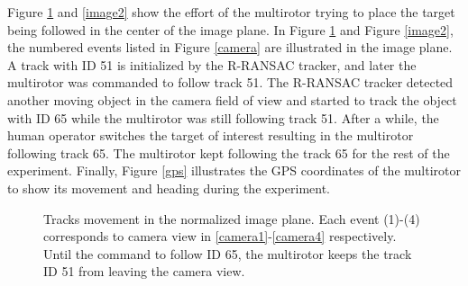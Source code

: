 Figure \ref{image1} and \ref{image2} show the effort of the multirotor trying to place the target being followed in the center of the image plane. In Figure \ref{image1} and Figure \ref{image2}, the numbered events listed in Figure \ref{camera} are illustrated in the image plane. A track with ID 51 is initialized by the R-RANSAC tracker, and later the multirotor was commanded to follow track 51. The R-RANSAC tracker detected another moving object in the camera field of view and started to track the object with ID 65 while the multirotor was still following track 51. After a while, the human operator switches the target of interest resulting in the multirotor following track 65. The multirotor kept following the track 65 for the rest of the experiment. Finally, Figure \ref{gps} illustrates the GPS coordinates of the multirotor to show its movement and heading during the experiment. 

\begin{figure}[htbp]
	\centering
	\caption[Tracks movement in the normalized image plane.]{Tracks movement in the normalized image plane. Each event (1)-(4) corresponds to camera view in \ref{camera1}-\ref{camera4} respectively. Until the command to follow ID 65, the multirotor keeps the track ID 51 from leaving the camera view.}
	\label{image1}
\end{figure}

